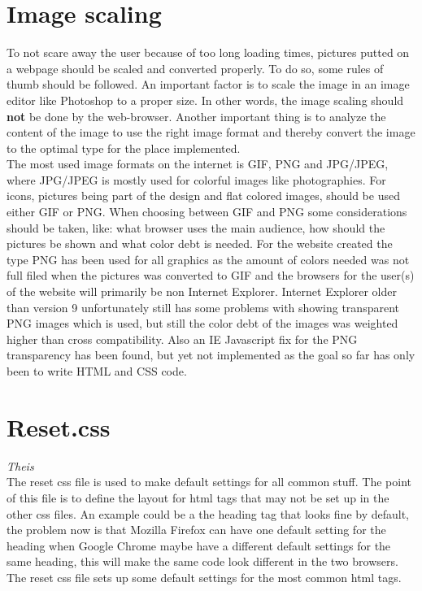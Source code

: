 \section{Image scaling}
To not scare away the user because of too long loading times, pictures putted on a webpage should be scaled and converted properly. To do so, some rules of thumb should be followed. An important factor is to scale the image in an image editor like Photoshop to a proper size. In other words, the image scaling should \textbf{not} be done by the web-browser. Another important thing is to analyze the content of the image to use the right image format and thereby convert the image to the optimal type for the place implemented.
\\The most used image formats on the internet is GIF, PNG and JPG/JPEG, where JPG/JPEG is mostly used for colorful images like photographies. For icons, pictures being part of the design and flat colored images, should be used either GIF or PNG. When choosing between GIF and PNG some considerations should be taken, like: what browser uses the main audience, how should the pictures be shown and what color debt is needed. For the website created the type PNG has been used for all graphics as the amount of colors needed was not full filed when the pictures was converted to GIF and the browsers for the user(s) of the website will primarily be non Internet Explorer. Internet Explorer older than version 9 unfortunately still has some problems with showing transparent PNG images which is used, but still the color debt of the images was weighted higher than cross compatibility. Also an IE Javascript fix for the PNG transparency has been found, but yet not implemented as the goal so far has only been to write HTML and CSS code. 

\section{Reset.css} \textit{Theis}\\
The reset css file is used to make default settings for all common stuff. The point of this file is to define the layout for html tags that may not be set up in the other css files. An example could be a the heading tag that looks fine by default, the problem now is that Mozilla Firefox can have one default setting for the heading when Google Chrome maybe have a different default settings for the same heading, this will make the same code look different in the two browsers. The reset css file sets up some default settings for the most common html tags.
